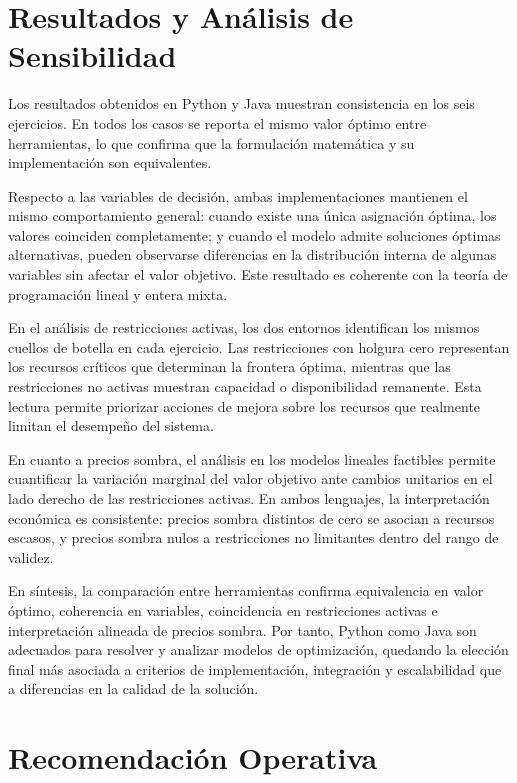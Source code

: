 \documentclass[12pt,letterpaper]{article}
\begin{document}
\section{Resultados y Análisis de Sensibilidad}

Los resultados obtenidos en Python y Java muestran consistencia en los seis ejercicios. En todos los casos se reporta el mismo valor óptimo entre herramientas, lo que confirma que la formulación matemática y su implementación son equivalentes.

Respecto a las variables de decisión, ambas implementaciones mantienen el mismo comportamiento general: cuando existe una única asignación óptima, los valores coinciden completamente; y cuando el modelo admite soluciones óptimas alternativas, pueden observarse diferencias en la distribución interna de algunas variables sin afectar el valor objetivo. Este resultado es coherente con la teoría de programación lineal y entera mixta.

En el análisis de restricciones activas, los dos entornos identifican los mismos cuellos de botella en cada ejercicio. Las restricciones con holgura cero representan los recursos críticos que determinan la frontera óptima, mientras que las restricciones no activas muestran capacidad o disponibilidad remanente. Esta lectura permite priorizar acciones de mejora sobre los recursos que realmente limitan el desempeño del sistema.

En cuanto a precios sombra, el análisis en los modelos lineales factibles permite cuantificar la variación marginal del valor objetivo ante cambios unitarios en el lado derecho de las restricciones activas. En ambos lenguajes, la interpretación económica es consistente: precios sombra distintos de cero se asocian a recursos escasos, y precios sombra nulos a restricciones no limitantes dentro del rango de validez.

En síntesis, la comparación entre herramientas confirma equivalencia en valor óptimo, coherencia en variables, coincidencia en restricciones activas e interpretación alineada de precios sombra. Por tanto,  Python como Java son adecuados para resolver y analizar modelos de optimización, quedando la elección final más asociada a criterios de implementación, integración y escalabilidad que a diferencias en la calidad de la solución.

\section{Recomendación Operativa}
\end{document}
